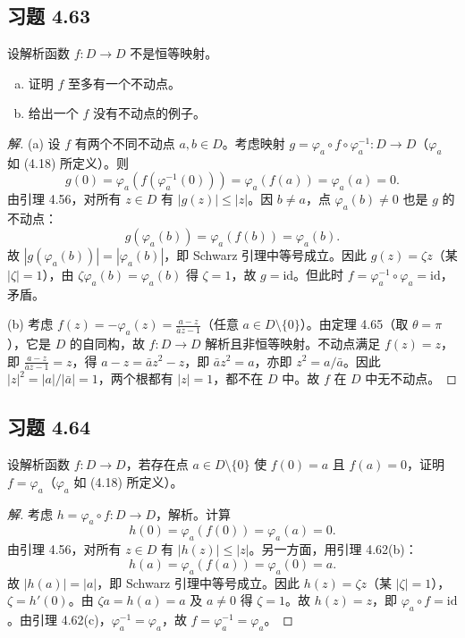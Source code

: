 \documentclass[11pt,a4paper]{article}
\theoremstyle{definition}
\newenvironment{solution}{\begin{proof}[解]}{\end{proof}}
\begin{document}
\subsection{习题 4.63}

设解析函数 $f : D \to D$ 不是恒等映射。
\begin{enumerate}[(a)]
  \item 证明 $f$ 至多有一个不动点。
  \item 给出一个 $f$ 没有不动点的例子。
\end{enumerate}

\begin{solution}
  (a) 设 $f$ 有两个不同不动点 $a, b \in D$。考虑映射 $g = \varphi_a \circ f \circ \varphi_a^{-1} : D \to D$（$\varphi_a$ 如 (4.18) 所定义）。则
  \[
    g(0) = \varphi_a(f(\varphi_a^{-1}(0))) = \varphi_a(f(a))
    = \varphi_a(a) = 0.
  \]
  由引理 4.56，对所有 $z \in D$ 有 $|g(z)| \le |z|$。因 $b \ne a$，点 $\varphi_a(b) \ne 0$ 也是 $g$ 的不动点：
  \[
    g(\varphi_a(b)) = \varphi_a(f(b)) = \varphi_a(b).
  \]
  故 $|g(\varphi_a(b))| = |\varphi_a(b)|$，即 Schwarz 引理中等号成立。因此 $g(z) = \zeta z$（某 $|\zeta| = 1$），由 $\zeta \varphi_a(b) = \varphi_a(b)$ 得 $\zeta = 1$，故 $g = \mathrm{id}$。但此时 $f = \varphi_a^{-1} \circ \varphi_a = \mathrm{id}$，矛盾。

  \medskip
  (b) 考虑 $f(z) = -\varphi_a(z) = \frac{a - z}{\bar{a}z - 1}$（任意 $a \in D \setminus \{0\}$）。由定理 4.65（取 $\theta = \pi$），它是 $D$ 的自同构，故 $f : D \to D$ 解析且非恒等映射。不动点满足 $f(z) = z$，即 $\frac{a - z}{\bar{a}z - 1} = z$，得 $a - z = \bar{a}z^2 - z$，即 $\bar{a}z^2 = a$，亦即 $z^2 = a/\bar{a}$。因此 $|z|^2 = |a|/|\bar{a}| = 1$，两个根都有 $|z| = 1$，都不在 $D$ 中。故 $f$ 在 $D$ 中无不动点。
\end{solution}

\subsection{习题 4.64}

设解析函数 $f : D \to D$，若存在点 $a \in D \setminus \{0\}$ 使 $f(0) = a$ 且 $f(a) = 0$，证明 $f = \varphi_a$（$\varphi_a$ 如 (4.18) 所定义）。

\begin{solution}
  考虑 $h = \varphi_a \circ f : D \to D$，解析。计算
  \[
    h(0) = \varphi_a(f(0)) = \varphi_a(a) = 0.
  \]
  由引理 4.56，对所有 $z \in D$ 有 $|h(z)| \le |z|$。另一方面，用引理 4.62(b)：
  \[
    h(a) = \varphi_a(f(a)) = \varphi_a(0) = a.
  \]
  故 $|h(a)| = |a|$，即 Schwarz 引理中等号成立。因此 $h(z) = \zeta z$（某 $|\zeta| = 1$），$\zeta = h'(0)$。由 $\zeta a = h(a) = a$ 及 $a \ne 0$ 得 $\zeta = 1$。故 $h(z) = z$，即 $\varphi_a \circ f = \mathrm{id}$。由引理 4.62(c)，$\varphi_a^{-1} = \varphi_a$，故 $f = \varphi_a^{-1} = \varphi_a$。
\end{solution}
\end{document}
